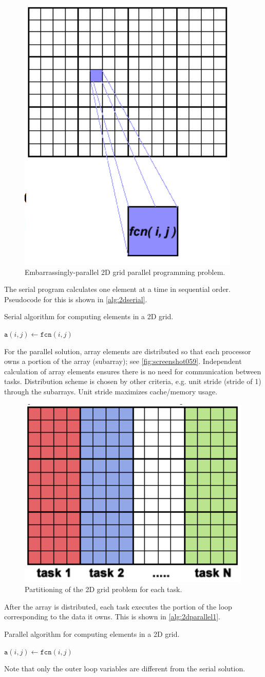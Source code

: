 \begin{figure}
\centering
\includegraphics[width=0.3\linewidth]{screenshot058}
\caption{Embarrassingly-parallel 2D grid parallel programming problem.}
\label{fig:screenshot058}
\end{figure}


The serial program calculates one element at a time in sequential order. Pseudocode for this is shown in \autoref{alg:2dserial}.
\begin{algorithm}  
\caption{Serial algorithm for computing elements in a 2D grid.}
\label{alg:2dserial}
\begin{algorithmic}
		\State $\mathtt{a}(i,j) \gets \mathtt{fcn}(i,j)$
	\EndFor
\EndFor
\end{algorithmic}
\end{algorithm}

For the parallel solution, array elements are distributed so that each processor owns a portion of the array (subarray); see \autoref{fig:screenshot059}. Independent calculation of array elements ensures there is no need for communication between tasks.  Distribution scheme is chosen by other criteria, e.g. unit stride (stride of 1) through the subarrays. Unit stride maximizes cache/memory usage.
\begin{figure}
\centering
\includegraphics[width=0.4\linewidth]{screenshot059}
\caption{Partitioning of the 2D grid problem for each task.}
\label{fig:screenshot059}
\end{figure}


After the array is distributed, each task executes the portion of the loop corresponding to the data it owns. This is shown in \autoref{alg:2dparallel1}.
\begin{algorithm}  
\caption{Parallel algorithm for computing elements in a 2D grid.}
\label{alg:2dparallel1}
\begin{algorithmic}
		\State $\mathtt{a}(i,j) \gets \mathtt{fcn}(i,j)$
	\EndFor
\EndFor
\end{algorithmic}
\end{algorithm}
Note that only the outer loop variables are different from the serial solution.

